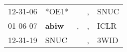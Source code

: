 \begin{supertabular}{p{0.07\textwidth}p{0.06\textwidth}p{0.02\textwidth}p{0.02\textwidth}p{0.06\textwidth}}
 12-31-06\textsuperscript{} &                            *OE1* &    &  , &  SNUC\textsuperscript{} \\
 01-06-07\textsuperscript{} &  \textbf{abiw\textsuperscript{}} &  , &  , &  ICLR\textsuperscript{} \\
 12-31-19\textsuperscript{} &           SNUC\textsuperscript{} &    &  , &  3WID\textsuperscript{} \\
\end{supertabular}
